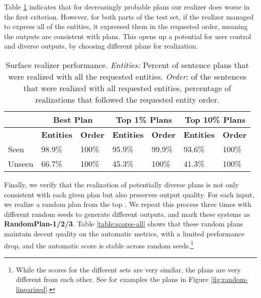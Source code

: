 \documentclass[11pt,a4paper]{article}
\newcommand\ourrandom[1]{RandomPlan-#1}
\begin{document}
Table \ref{table:coverage} indicates that for decreasingly probable plans our realizer does worse in the first criterion. However, for both parts of the test set,
if the realizer managed to express all of the entities, it expressed them in the requested order, meaning the outputs are consistent with plans.
This opens up a potential for user control and diverse outputs, by choosing different plans for realization.

\begin{table}[!t]
\centering
\resizebox{\linewidth}{!}
{\begin{tabular}{|l|l|l|l|l|l|l|}
\hline
       & \multicolumn{2}{c|}{\textbf{Best Plan}} & \multicolumn{2}{c|}{\textbf{Top 1\% Plans}} & \multicolumn{2}{c|}{\textbf{Top 10\% Plans}}     \\ \hline
       & \textbf{Entities} & \textbf{Order} & \textbf{Entities} & \textbf{Order} & \textbf{Entities} & \textbf{Order} \\ \hline
Seen   & 98.9\%                  & 100\%                & 95.9\%                  & 99.9\%                & 93.6\%                  & 100\%                \\ \hline
Unseen & 66.7\%                  & 100\%                & 45.3\%                  & 100\%                & 41.3\%                  & 100\%                \\ \hline

\end{tabular}}
\centering

\caption{Surface realizer performance. \emph{Entities:} Percent of sentence plans that were realized with all the requested entities. \emph{Order}: of the sentences that were realized with all requested entities, percentage of realizations that followed the requested entity order.}
\label{table:coverage}
\end{table}





%
 
Finally, we verify that the realization of potentially diverse plans is not only consistent with each given plan but also preserves output quality.
For each input, we realize a random plan from the top . We repeat this process three times with different random seeds to generate different outputs, and mark these systems as \textbf{\ourrandom{1/2/3}}. 
Table \ref{table:scores-all} shows that these random plans maintain decent quality on the automatic metrics, with a limited performance drop, and the automatic score is stable across random seeds.\footnote{While the scores for the different sets are very similar, the plans are very different from each other. See for examples the plans in Figure \ref{fig:random-linearized}.}  
\end{document}
